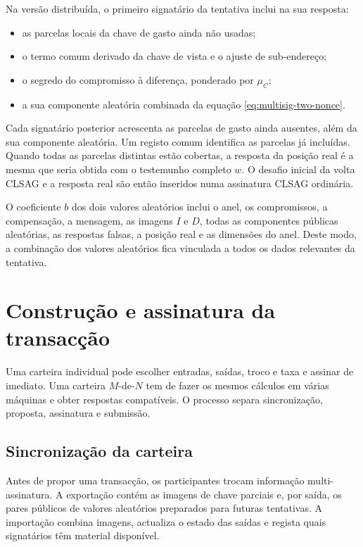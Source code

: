 %
Na versão distribuída, o primeiro signatário da tentativa inclui na sua
resposta:
\begin{itemize}
 \item as parcelas locais da chave de gasto ainda não usadas;
 \item o termo comum derivado da chave de vista e o ajuste de sub-endereço;
 \item o segredo do compromisso à diferença, ponderado por \(\mu_C\);
 \item a sua componente aleatória combinada da
 equação \eqref{eq:multisig-two-nonce}.
\end{itemize}
Cada signatário posterior acrescenta as parcelas de gasto ainda ausentes,
além da sua componente aleatória. Um registo comum identifica as parcelas
já incluídas.
Quando todas as parcelas distintas estão cobertas, a resposta da posição real
é a mesma que seria obtida com o testemunho completo \(w\). O desafio inicial
da volta CLSAG e a resposta real são então inseridos numa assinatura CLSAG
ordinária.

O coeficiente \(b\) dos dois valores aleatórios inclui o anel, os
compromissos, a compensação, a mensagem, as imagens \(I\) e \(D\), todas as
componentes públicas aleatórias, as respostas falsas, a posição real e as
dimensões do anel. Deste modo, a combinação dos valores aleatórios fica
vinculada a todos os dados relevantes da tentativa.

\section{Construção e assinatura da transacção}

Uma carteira individual pode escolher entradas, saídas, troco e taxa e assinar
de imediato. Uma carteira \(M\)-de-\(N\) tem de fazer os mesmos cálculos em
várias máquinas e obter respostas compatíveis. O processo separa
sincronização, proposta, assinatura e submissão.

\subsection{Sincronização da carteira}

Antes de propor uma transacção, os participantes trocam informação
multi-assinatura. A exportação contém as imagens de chave parciais e, por
saída, os pares públicos de valores aleatórios preparados para futuras
tentativas. A importação combina imagens, actualiza o estado das saídas e
regista quais signatários têm material disponível.

